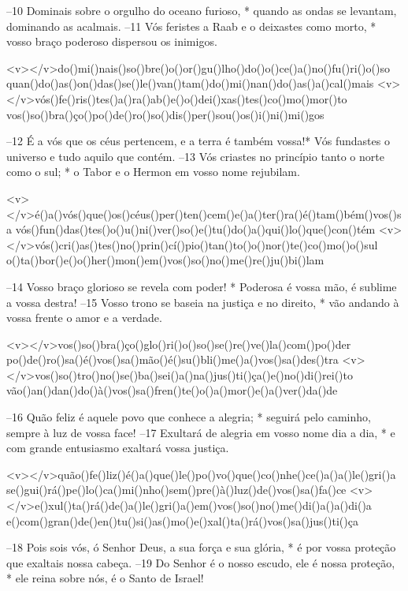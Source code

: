 –10 Dominais sobre o orgulho do oceano furioso, *
quando as ondas se levantam, dominando as acalmais. 
–11 Vós feristes a Raab e o deixastes como morto, *
vosso braço poderoso dispersou os inimigos.

<v></v>do()mi()nais()so()bre()o()or()gu()lho()do()o()ce()a()no()fu()ri()o()so
quan()do()as()on()das()se()le()van()tam()do()mi()nan()do()as()a()cal()mais
<v></v>vós()fe()ris()tes()a()ra()ab()e()o()dei()xas()tes()co()mo()mor()to
vos()so()bra()ço()po()de()ro()so()dis()per()sou()os()i()ni()mi()gos

–12 É a vós que os céus pertencem, e a terra é também vossa!*
Vós fundastes o universo e tudo aquilo que contém. 
–13 Vós criastes no princípio tanto o norte como o sul; *
o Tabor e o Hermon em vosso nome rejubilam.

<v></v>é()a()vós()que()os()céus()per()ten()cem()e()a()ter()ra()é()tam()bém()vos()sa
vós()fun()das()tes()o()u()ni()ver()so()e()tu()do()a()qui()lo()que()con()tém
<v></v>vós()cri()as()tes()no()prin()cí()pio()tan()to()o()nor()te()co()mo()o()sul
o()ta()bor()e()o()her()mon()em()vos()so()no()me()re()ju()bi()lam

–14 Vosso braço glorioso se revela com poder! *
Poderosa é vossa mão, é sublime a vossa destra! 
–15 Vosso trono se baseia na justiça e no direito, *
vão andando à vossa frente o amor e a verdade.

<v></v>vos()so()bra()ço()glo()ri()o()so()se()re()ve()la()com()po()der
po()de()ro()sa()é()vos()sa()mão()é()su()bli()me()a()vos()sa()des()tra
<v></v>vos()so()tro()no()se()ba()sei()a()na()jus()ti()ça()e()no()di()rei()to
vão()an()dan()do()à()vos()sa()fren()te()o()a()mor()e()a()ver()da()de

–16 Quão feliz é aquele povo que conhece a alegria; *
seguirá pelo caminho, sempre à luz de vossa face! 
–17 Exultará de alegria em vosso nome dia a dia, *
e com grande entusiasmo exaltará vossa justiça.

<v></v>quão()fe()liz()é()a()que()le()po()vo()que()co()nhe()ce()a()a()le()gri()a
se()gui()rá()pe()lo()ca()mi()nho()sem()pre()à()luz()de()vos()sa()fa()ce
<v></v>e()xul()ta()rá()de()a()le()gri()a()em()vos()so()no()me()di()a()a()di()a
e()com()gran()de()en()tu()si()as()mo()e()xal()ta()rá()vos()sa()jus()ti()ça

–18 Pois sois vós, ó Senhor Deus, a sua força e sua glória, *
é por vossa proteção que exaltais nossa cabeça. 
–19 Do Senhor é o nosso escudo, ele é nossa proteção, *
ele reina sobre nós, é o Santo de Israel!

